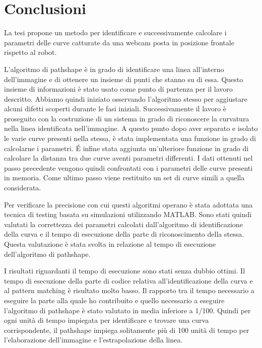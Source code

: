 \chapter{Conclusioni}

    La tesi propone un metodo per identificare e successivamente calcolare i parametri delle curve catturate da una webcam posta in posizione frontale rispetto al robot.

    L'algoritmo di pathshape è in grado di identificare una linea all'interno dell'immagine e di ottenere un insieme di punti che stanno su di essa. Questo insieme di informazioni è stato usato come punto di partenza per il lavoro descritto. Abbiamo quindi iniziato osservando l'algoritmo stesso per aggiustare alcuni difetti scoperti durante le fasi iniziali. Successivamente il lavoro è proseguito con la costruzione di un sistema in grado di riconoscere la curvatura nella linea identificata nell'immagine. A questo punto dopo aver separato e isolato le varie curve presenti nella stessa, è stata implementata una funzione in grado di calcolarne i parametri. \'E infine stata aggiunta un'ulteriore funzione in grado di calcolare la distanza tra due curve aventi parametri differenti. I dati ottenuti nel passo precedente vengono quindi confrontati con i parametri delle curve presenti in memoria. Come ultimo passo viene restituito un set di curve simili a quella considerata.

    Per verificare la precisione con cui questi algoritmi operano è stata adottata una tecnica di testing basata su simulazioni utilizzando MATLAB. Sono stati quindi valutati la correttezza dei parametri calcolati dall'algoritmo di identificazione della curva e il tempo di esecuzione della parte di riconoscimento della stessa. Questa valutazione è stata svolta in relazione al tempo di esecuzione dell'algoritmo di pathshape.

    I risultati riguardanti il tempo di esecuzione sono stati senza dubbio ottimi. Il tempo di esecuzione della parte di codice relativa all'identificazione della curva e al pattern matching è risultato molto basso. Il rapporto tra il tempo necessario a eseguire la parte alla quale ho contribuito e quello necessario a eseguire l'algoritmo di pathshape è stato valutato in media inferiore a 1/100. Quindi per ogni unità di tempo impiegata per identificare e trovare una curva corrispondente, il pathshape impiega solitamente più di 100 unità di tempo per l'elaborazione dell'immagine e l'estrapolazione della linea.

